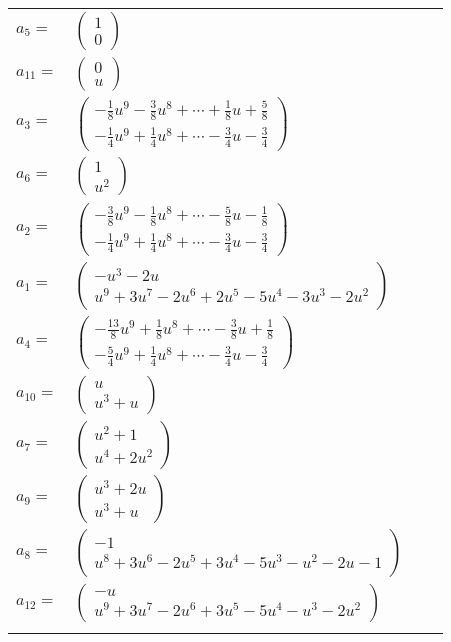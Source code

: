 \documentclass[1p]{elsarticle_modified}
\theoremstyle{definition}
\begin{document}
\begin{tabular}{m{7pt} m{180pt} m{7pt} m{180pt} }
\flushright $a_{5}=$&$\begin{pmatrix}1\\0\end{pmatrix}$ \\
\flushright $a_{11}=$&$\begin{pmatrix}0\\u\end{pmatrix}$ \\
\flushright $a_{3}=$&$\begin{pmatrix}-\frac{1}{8} u^9-\frac{3}{8} u^8+\cdots+\frac{1}{8} u+\frac{5}{8}\\-\frac{1}{4} u^9+\frac{1}{4} u^8+\cdots-\frac{3}{4} u-\frac{3}{4}\end{pmatrix}$ \\
\flushright $a_{6}=$&$\begin{pmatrix}1\\u^2\end{pmatrix}$ \\
\flushright $a_{2}=$&$\begin{pmatrix}-\frac{3}{8} u^9-\frac{1}{8} u^8+\cdots-\frac{5}{8} u-\frac{1}{8}\\-\frac{1}{4} u^9+\frac{1}{4} u^8+\cdots-\frac{3}{4} u-\frac{3}{4}\end{pmatrix}$ \\
\flushright $a_{1}=$&$\begin{pmatrix}- u^3-2 u\\u^9+3 u^7-2 u^6+2 u^5-5 u^4-3 u^3-2 u^2\end{pmatrix}$ \\
\flushright $a_{4}=$&$\begin{pmatrix}-\frac{13}{8} u^9+\frac{1}{8} u^8+\cdots-\frac{3}{8} u+\frac{1}{8}\\-\frac{5}{4} u^9+\frac{1}{4} u^8+\cdots-\frac{3}{4} u-\frac{3}{4}\end{pmatrix}$ \\
\flushright $a_{10}=$&$\begin{pmatrix}u\\u^3+u\end{pmatrix}$ \\
\flushright $a_{7}=$&$\begin{pmatrix}u^2+1\\u^4+2 u^2\end{pmatrix}$ \\
\flushright $a_{9}=$&$\begin{pmatrix}u^3+2 u\\u^3+u\end{pmatrix}$ \\
\flushright $a_{8}=$&$\begin{pmatrix}-1\\u^8+3 u^6-2 u^5+3 u^4-5 u^3- u^2-2 u-1\end{pmatrix}$ \\
\flushright $a_{12}=$&$\begin{pmatrix}- u\\u^9+3 u^7-2 u^6+3 u^5-5 u^4- u^3-2 u^2\end{pmatrix}$\\&\end{tabular}
\end{document}

